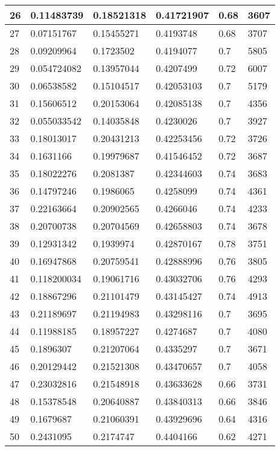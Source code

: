 \begin{longtable}{|l|l|l|l|l|l|}
26 & 0.11483739 & 0.18521318 & 0.41721907 & 0.68 & 3607 \\ \hline 
27 & 0.07151767 & 0.15455271 & 0.4193748 & 0.68 & 3707 \\ \hline 
28 & 0.09209964 & 0.1723502 & 0.4194077 & 0.7 & 5805 \\ \hline 
29 & 0.054724082 & 0.13957044 & 0.4207499 & 0.72 & 6007 \\ \hline 
30 & 0.06538582 & 0.15104517 & 0.42053103 & 0.7 & 5179 \\ \hline 
31 & 0.15606512 & 0.20153064 & 0.42085138 & 0.7 & 4356 \\ \hline 
32 & 0.055033542 & 0.14035848 & 0.4230026 & 0.7 & 3927 \\ \hline 
33 & 0.18013017 & 0.20431213 & 0.42253456 & 0.72 & 3726 \\ \hline 
34 & 0.1631166 & 0.19979687 & 0.41546452 & 0.72 & 3687 \\ \hline 
35 & 0.18022276 & 0.2081387 & 0.42344603 & 0.74 & 3683 \\ \hline 
36 & 0.14797246 & 0.1986065 & 0.4258099 & 0.74 & 4361 \\ \hline 
37 & 0.22163664 & 0.20902565 & 0.4266046 & 0.74 & 4233 \\ \hline 
38 & 0.20700738 & 0.20704569 & 0.42658803 & 0.74 & 3678 \\ \hline 
39 & 0.12931342 & 0.1939974 & 0.42870167 & 0.78 & 3751 \\ \hline 
40 & 0.16947868 & 0.20759541 & 0.42888996 & 0.76 & 3805 \\ \hline 
41 & 0.118200034 & 0.19061716 & 0.43032706 & 0.76 & 4293 \\ \hline 
42 & 0.18867296 & 0.21101479 & 0.43145427 & 0.74 & 4913 \\ \hline 
43 & 0.21189697 & 0.21194983 & 0.43298116 & 0.7 & 3695 \\ \hline 
44 & 0.11988185 & 0.18957227 & 0.4274687 & 0.7 & 4080 \\ \hline 
45 & 0.1896307 & 0.21207064 & 0.4335297 & 0.7 & 3671 \\ \hline 
46 & 0.20129442 & 0.21521308 & 0.43470657 & 0.7 & 4058 \\ \hline 
47 & 0.23032816 & 0.21548918 & 0.43633628 & 0.66 & 3731 \\ \hline 
48 & 0.15378548 & 0.20640887 & 0.43840313 & 0.66 & 3846 \\ \hline 
49 & 0.1679687 & 0.21060391 & 0.43929696 & 0.64 & 4316 \\ \hline 
50 & 0.2431095 & 0.2174747 & 0.4404166 & 0.62 & 4271 \\ \hline 
\end{longtable}